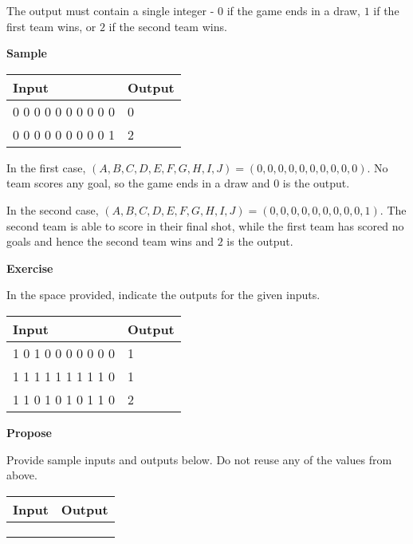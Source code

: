 \documentclass[a4paper]{exam}
\newcommand\heading[1]{\textbf{#1}}
\begin{document}
\begin{questions}
    The output must contain a single integer - $0$ if the game ends in a draw, $1$ if the first team wins, or $2$ if the second team wins.

    \heading{Sample}

    \begin{tabularx}{\textwidth}{|X|X|}
        \rowcolor{gray!50}
        \hline
        Input               & Output \\ \hline\hline
        0 0 0 0 0 0 0 0 0 0 & 0      \\\hline
        0 0 0 0 0 0 0 0 0 1 & 2      \\\hline
    \end{tabularx}

    In the first case, $(A,B,C,D,E,F,G,H,I,J) = (0,0,0,0,0,0,0,0,0,0)$. No team scores any goal, so the game ends in a draw and $0$ is the output.

    In the second case, $(A,B,C,D,E,F,G,H,I,J) = (0,0,0,0,0,0,0,0,0,1)$. The second team is able to score in their final shot, while the first team has scored no goals and hence the second team wins and $2$ is the output.

    \heading{Exercise}

    In the space provided, indicate the outputs for the given inputs.

    \begin{tabularx}{\textwidth}{|X|X|}
        \rowcolor{gray!50}
        \hline
        Input               & Output \\ \hline\hline
        1 0 1 0 0 0 0 0 0 0 & 1      \\\hline
        1 1 1 1 1 1 1 1 1 0 & 1      \\\hline
        1 1 0 1 0 1 0 1 1 0 & 2      \\\hline
    \end{tabularx}

    \heading{Propose}

    Provide sample inputs and outputs below. Do not reuse any of the values from above.

    \begin{tabularx}{\textwidth}{|X|X|}
        \rowcolor{gray!50}
        \hline
        Input & Output \\ \hline\hline
              &        \\\hline
              &        \\\hline
              &        \\\hline
    \end{tabularx}


\end{questions}
\end{document}
